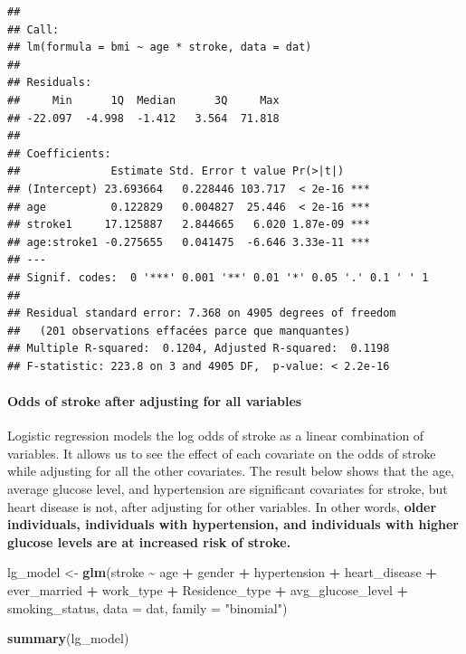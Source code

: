 \documentclass[
]{article}
\newenvironment{Shaded}{\begin{snugshade}}{\end{snugshade}}
\newcommand{\AttributeTok}[1]{\textcolor[rgb]{0.13,0.29,0.53}{#1}}
\newcommand{\FunctionTok}[1]{\textcolor[rgb]{0.13,0.29,0.53}{\textbf{#1}}}
\newcommand{\NormalTok}[1]{#1}
\newcommand{\OtherTok}[1]{\textcolor[rgb]{0.56,0.35,0.01}{#1}}
\newcommand{\SpecialCharTok}[1]{\textcolor[rgb]{0.81,0.36,0.00}{\textbf{#1}}}
\newcommand{\StringTok}[1]{\textcolor[rgb]{0.31,0.60,0.02}{#1}}
\begin{document}
\begin{verbatim}
## 
## Call:
## lm(formula = bmi ~ age * stroke, data = dat)
## 
## Residuals:
##     Min      1Q  Median      3Q     Max 
## -22.097  -4.998  -1.412   3.564  71.818 
## 
## Coefficients:
##              Estimate Std. Error t value Pr(>|t|)    
## (Intercept) 23.693664   0.228446 103.717  < 2e-16 ***
## age          0.122829   0.004827  25.446  < 2e-16 ***
## stroke1     17.125887   2.844665   6.020 1.87e-09 ***
## age:stroke1 -0.275655   0.041475  -6.646 3.33e-11 ***
## ---
## Signif. codes:  0 '***' 0.001 '**' 0.01 '*' 0.05 '.' 0.1 ' ' 1
## 
## Residual standard error: 7.368 on 4905 degrees of freedom
##   (201 observations effacées parce que manquantes)
## Multiple R-squared:  0.1204, Adjusted R-squared:  0.1198 
## F-statistic: 223.8 on 3 and 4905 DF,  p-value: < 2.2e-16
\end{verbatim}

\paragraph{\texorpdfstring{\textbf{Odds of stroke after adjusting for
all
variables}}{Odds of stroke after adjusting for all variables}}\label{odds-of-stroke-after-adjusting-for-all-variables}

Logistic regression models the log odds of stroke as a linear
combination of variables. It allows us to see the effect of each
covariate on the odds of stroke while adjusting for all the other
covariates. The result below shows that the age, average glucose level,
and hypertension are significant covariates for stroke, but heart
disease is not, after adjusting for other variables. In other words,
\textbf{older individuals, individuals with hypertension, and
individuals with higher glucose levels are at increased risk of stroke.}

\begin{Shaded}
\begin{Highlighting}[]
\NormalTok{lg\_model }\OtherTok{\textless{}{-}} \FunctionTok{glm}\NormalTok{(stroke }\SpecialCharTok{\textasciitilde{}}\NormalTok{ age }\SpecialCharTok{+}\NormalTok{ gender }\SpecialCharTok{+}\NormalTok{ hypertension }\SpecialCharTok{+}\NormalTok{ heart\_disease }\SpecialCharTok{+}\NormalTok{ ever\_married }\SpecialCharTok{+}\NormalTok{ work\_type }\SpecialCharTok{+}\NormalTok{ Residence\_type }\SpecialCharTok{+}\NormalTok{ avg\_glucose\_level  }\SpecialCharTok{+}\NormalTok{ smoking\_status, }\AttributeTok{data =}\NormalTok{ dat, }\AttributeTok{family =} \StringTok{"binomial"}\NormalTok{)}

\FunctionTok{summary}\NormalTok{(lg\_model)}
\end{Highlighting}
\end{Shaded}
\end{document}
